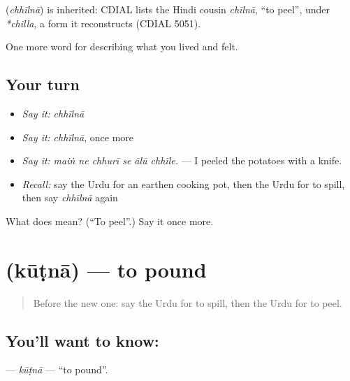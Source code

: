 \begin{cousinweb}
\textbf{} (\emph{chhīlnā}) is inherited: CDIAL lists the Hindi cousin \emph{chīlnā}, \textquotedblleft{}to peel\textquotedblright{}, under \emph{*chilla}, a form it reconstructs (CDIAL 5051).
\end{cousinweb}

\begin{grammarlens}[title={What you've built}]
One more word for describing what you lived and felt.
\end{grammarlens}

\subsection*{Your turn}
\begin{itemize}
\raggedright
  \item \emph{Say it:} \emph{chhīlnā}
  \item \emph{Say it:} \emph{chhīlnā}, once more
  \item \emph{Say it:} \emph{maiṅ ne chhurī se ālū chhīle.} — I peeled the potatoes with a knife.
  \item \emph{Recall:} say the Urdu for an earthen cooking pot, then the Urdu for to spill, then say \emph{chhīlnā} again
\end{itemize}

\begin{tcolorbox}[breakable,colback=teal!4,colframe=teal!35!black,title={Before you move on}]
What does  mean? (\textquotedblleft{}To peel\textquotedblright{}.) Say it once more.
\end{tcolorbox}
\section[\texorpdfstring{\ur{کوٹنا} (kūṭnā)}{کوٹنا (kūṭnā)}]{ (kūṭnā) — to pound}

\label{lesson:UR-C510-kutna}



\begin{quote}
Before the new one: say the Urdu for to spill, then the Urdu for to peel.
\end{quote}

\subsection*{You'll want to know: }
\textbf{} — \emph{kūṭnā} — \textquotedblleft{}to pound\textquotedblright{}.

